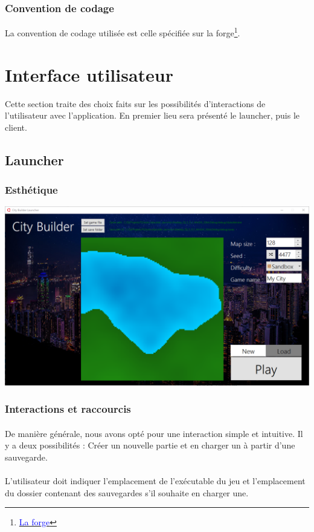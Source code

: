 \documentclass[a4paper,10pt,openany,oneside]{report}
\begin{document}
\subsubsection{Convention de codage}
La convention de codage utilisée est celle spécifiée sur la forge\footnote{\href{https://forge.ing.he-arc.ch/gitlab/dgr/Ressources/wikis/convention}{\textcolor{blue}{La forge}}}.
\section{Interface utilisateur}
Cette section traite des choix faits sur les possibilités d'interactions de l'utilisateur avec l'application. En premier lieu sera présenté le launcher, puis le client. 
\subsection{Launcher}
\subsubsection{Esthétique}
\includegraphics[width=\textwidth]{img/ui_launcher.png}
\subsubsection{Interactions et raccourcis}
\paragraph{}
De manière générale, nous avons opté pour une interaction simple et intuitive. Il y a deux possibilités : Créer un nouvelle partie et en charger un à partir d'une sauvegarde.
\paragraph{}
L'utilisateur doit indiquer l'emplacement de l'exécutable du jeu et l'emplacement du dossier contenant des sauvegardes s'il souhaite en charger une.
\end{document}
